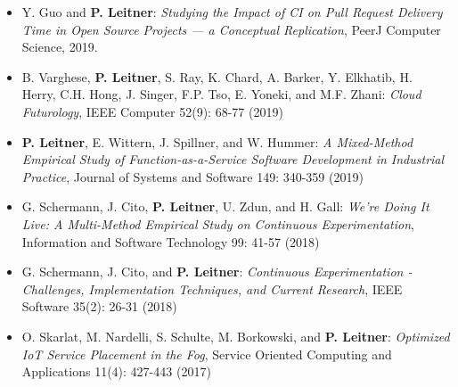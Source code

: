 \documentclass[paper=letter,fontsize=11pt]{scrartcl} %
\begin{document}
\begin{itemize}
{ Literature Review}, Journal of Systems and Software (JSS), vol. 170. 2020.
	\item  Y. Guo and \textbf{P. Leitner}: \emph{Studying the Impact of CI on Pull Request Delivery Time in Open Source Projects — a Conceptual Replication}, PeerJ Computer Science, 2019.
	\item  B. Varghese, \textbf{P. Leitner}, S. Ray, K. Chard, A. Barker, Y. Elkhatib, H. Herry, C.H. Hong, J. Singer, F.P. Tso, E. Yoneki, and M.F. Zhani: \emph{Cloud Futurology}, IEEE Computer 52(9): 68-77 (2019)
	\item \textbf{P. Leitner}, E. Wittern, J. Spillner, and W. Hummer: \emph{A Mixed-Method Empirical Study of Function-as-a-Service Software Development in Industrial Practice}, Journal of Systems and Software 149: 340-359 (2019)
		\item  G. Schermann, J. Cito, \textbf{P. Leitner}, U. Zdun, and H. Gall: \emph{We're Doing It Live: A Multi-Method Empirical Study on Continuous Experimentation}, Information and Software Technology 99: 41-57 (2018)
	\item  G. Schermann, J. Cito, and \textbf{P. Leitner}: \emph{Continuous Experimentation - Challenges, Implementation Techniques, and Current Research},  IEEE Software 35(2): 26-31 (2018)
	\item  O. Skarlat, M. Nardelli, S. Schulte, M. Borkowski, and \textbf{P. Leitner}: \emph{Optimized IoT Service Placement in the Fog}, Service Oriented Computing and Applications 11(4): 427-443 (2017)
\end{itemize}
\end{document}
